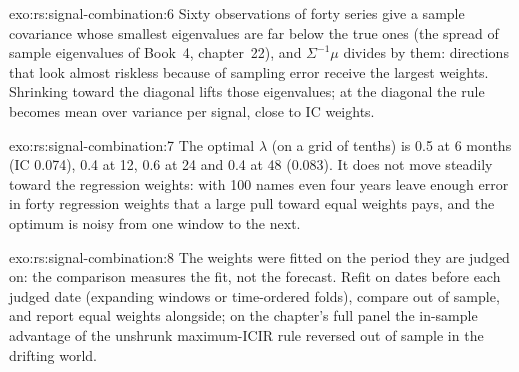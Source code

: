 \begin{solution}{exo:rs:signal-combination:6}
Sixty observations of forty series give a sample covariance whose smallest eigenvalues are far below the true ones (the spread of sample eigenvalues
of Book~4, chapter~22), and $\Sigma^{-1}\mu$ divides by them: directions that look almost riskless because of sampling error receive the largest
weights. Shrinking toward the diagonal lifts those eigenvalues; at the diagonal the rule becomes mean over variance per signal, close to IC weights.
\end{solution}

\begin{solution}{exo:rs:signal-combination:7}
The optimal $\lambda$ (on a grid of tenths) is 0.5 at 6 months (IC 0.074), 0.4 at 12, 0.6 at 24 and 0.4 at 48 (0.083). It does not move steadily toward
the regression weights: with 100 names even four years leave enough error in forty regression weights that a large pull toward equal weights pays, and
the optimum is noisy from one window to the next.
\end{solution}

\begin{solution}{exo:rs:signal-combination:8}
The weights were fitted on the period they are judged on: the comparison measures the fit, not the forecast. Refit on dates before each judged date
(expanding windows or time-ordered folds), compare out of sample, and report equal weights alongside; on the chapter's full panel the in-sample
advantage of the unshrunk maximum-ICIR rule reversed out of sample in the drifting world.
\end{solution}

